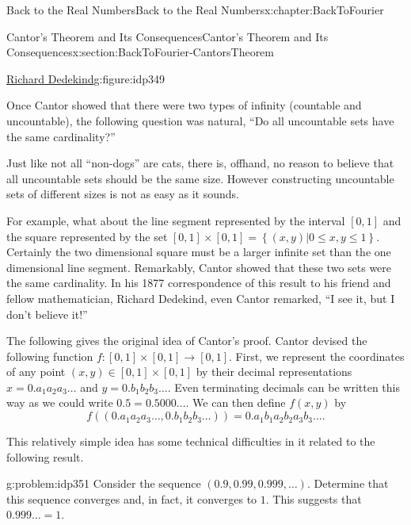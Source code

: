 \begin{chapterptx}{Back to the Real Numbers}{}{Back to the Real Numbers}{}{}{x:chapter:BackToFourier}
\begin{sectionptx}{Cantor's Theorem and Its Consequences}{}{Cantor's Theorem and Its Consequences}{}{}{x:section:BackToFourier-CantorsTheorem}
\begin{figureptx}{\href{https://mathshistory.st-andrews.ac.uk/Biographies/Dedekind/}{Richard Dedekind}\protect\footnotemark{}}{g:figure:idp349}{}
\begin{image}{0.325}{0.35}{0.325}
			\end{image}%
			\tcblower
		\end{figureptx}%
		Once Cantor showed that there were two types of infinity (countable and uncountable), the following question was natural, ``Do all uncountable sets have the same cardinality?''%
		\par
		Just like not all ``non-dogs'' are cats, there is, offhand, no reason to believe that all uncountable sets should be the same size. However constructing uncountable sets of different sizes is not as easy as it sounds.%
		\par
		 For example, what about the line segment represented by the interval \([0,1]\) and the square represented by the set \([0,1]\times[0,1]=\left\{(x,y)|0\leq x,y\leq 1\right\}\). Certainly the two dimensional square must be a larger infinite set than the one dimensional line segment.  Remarkably, Cantor showed that these two sets were the same cardinality.  In his 1877 correspondence of this result to his friend and fellow mathematician, Richard Dedekind, even Cantor remarked, ``I see it, but I don't believe it!''%
		\par
		The following gives the original idea of Cantor's proof. Cantor devised the following function \(f:[0,1]\times[0,1]\rightarrow [0,1]\). First, we represent the coordinates of any point \((x,y)\in [0,1]\times[0,1]\) by their decimal representations \(x=0.a_1 a_2 a_3\ldots\) and \(y=0.b_1 b_2 b_3\ldots\). Even terminating decimals can be written this way as we could write \(0.5=0.5000\ldots\). We can then define \(f(x,y)\) by%
		\begin{equation*}
			f((0.a_1 a_2 a_3\ldots ,0.b_1 b_2 b_3\ldots))=0.a_1 b_1 a_2 b_2 a_3 b_3\ldots\text{.}
		\end{equation*}
		\par
		This relatively simple idea has some technical difficulties in it related to the following result.%
		\begin{problem}{}{g:problem:idp351}%
			 Consider the sequence \((0.9,0.99,0.999,\ldots)\). Determine that this sequence converges and, in fact, it converges to \(1\). This suggests that \(0.999\ldots=1\).%
		\end{problem}

\end{sectionptx}
\end{chapterptx}
